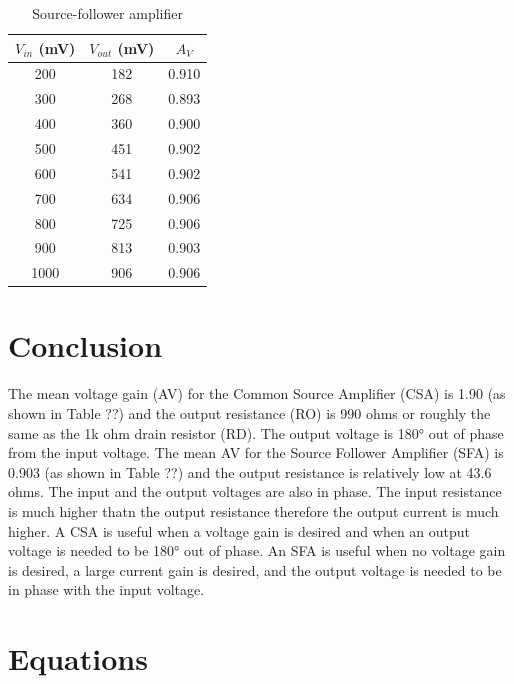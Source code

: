 \begin{table}[hbtp]
  \centering
  \begin{tabular}{ccc}
    $V_{in}$ (\si{mV}) & $V_{out}$ (\si{mV}) & $A_V$ \\
    \hline
    200                & 182                 & 0.910 \\
    300                & 268                 & 0.893 \\
    400                & 360                 & 0.900 \\
    500                & 451                 & 0.902 \\
    600                & 541                 & 0.902 \\
    700                & 634                 & 0.906 \\
    800                & 725                 & 0.906 \\
    900                & 813                 & 0.903 \\
    1000               & 906                 & 0.906 \\
  \end{tabular}
  \caption{\label{tab:source-follower} Source-follower amplifier}
\end{table}

\section{Conclusion}
\label{sec:conclusion}

The mean voltage gain (AV) for the Common Source Amplifier (CSA) is 1.90 (as shown in Table ??) and the output resistance (RO) is 990 ohms or roughly the same as the 1k ohm drain resistor (RD). The output voltage is 180° out of phase from the input voltage. The mean AV for the Source Follower Amplifier (SFA) is 0.903 (as shown in Table ??) and the output resistance is relatively low at 43.6 ohms. The input and the output voltages are also in phase. The input resistance is much higher thatn the output resistance therefore the output current is much higher. A CSA is useful when a voltage gain is desired and when an output voltage is needed to be 180° out of phase. An SFA is useful when no voltage gain is desired, a large current gain is desired, and the output voltage is needed to be in phase with the input voltage.

\section{Equations}
\label{sec:equations}

